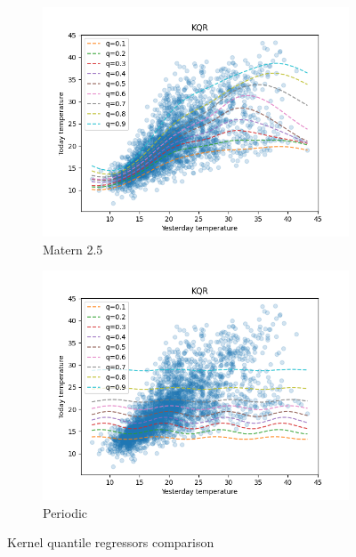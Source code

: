 \begin{figure}[!h]
    \begin{subfigure}[b]{0.5\linewidth}
        \centering
        \includegraphics[width=1.1\textwidth]{images/melborune_matern_2.5_kernel_quantile_regression.png}
        \caption{Matern 2.5} 
        \label{} 
    \end{subfigure} 
    \begin{subfigure}[b]{0.5\linewidth}
        \centering
        \includegraphics[width=1.1\textwidth]{images/melborune_periodic_kernel_quantile_regression.png}
        \caption{Periodic} 
        \label{} 
    \end{subfigure} 
    \caption{Kernel quantile regressors comparison}
    \label{fig:kernel quantile regressors comparison} 
\end{figure}

